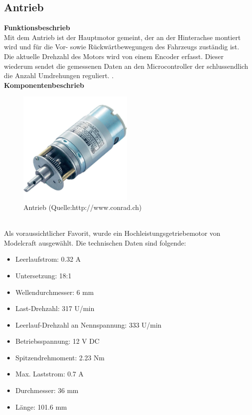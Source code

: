 \subsection{Antrieb}

\textbf{Funktionsbeschrieb}\\[0.2cm]
Mit dem Antrieb ist der Hauptmotor gemeint, der an der Hinterachse montiert wird und für die Vor- sowie Rückwärtbewegungen des Fahrzeugs zuständig ist.
Die aktuelle Drehzahl des Motors wird von einem Encoder erfasst. Dieser wiederum sendet die gemessenen Daten an den Microcontroller der schlussendlich die Anzahl Umdrehungen reguliert.
.\\[0.2cm]
\textbf{Komponentenbeschrieb}\\[0.2cm]
\begin{figure}[h]
\centering
\includegraphics[width=0.5\textwidth]{03_Loesungskonzept/pictures/antrieb.jpg}
\caption{Antrieb  (Quelle:http://www.conrad.ch)}	
\end{figure}\\[0.2cm]
Als voraussichtlicher Favorit, wurde ein Hochleistungsgetriebemotor von Modelcraft ausgewählt. Die technischen Daten sind folgende:
\begin{itemize}
\item Leerlaufstrom: 0.32 A
\item Untersetzung: 18:1
\item Wellendurchmesser: 6 mm
\item Last-Drehzahl: 317 U/min
\item Leerlauf-Drehzahl an Nennspannung: 333 U/min
\item Betriebsspannung: 12 V DC
\item Spitzendrehmoment: 2.23 Nm
\item Max. Laststrom: 0.7 A
\item Durchmesser: 36 mm
\item Länge: 101.6 mm
\end{itemize}\\[0.2cm]
